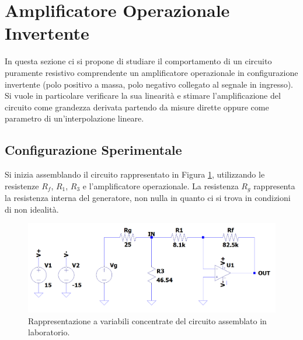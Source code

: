 \documentclass[a4paper,11pt]{article} %
\begin{document}
\cleardoublepage



\section{Amplificatore Operazionale Invertente}
In questa sezione ci si propone di studiare il comportamento di un circuito puramente resistivo comprendente un
amplificatore operazionale in configurazione invertente (polo positivo a massa, polo negativo collegato al segnale in
ingresso). Si vuole in particolare verificare la sua linearità e stimare l'amplificazione del circuito come grandezza derivata
partendo da misure dirette oppure come parametro di un'interpolazione lineare. 



\subsection{Configurazione Sperimentale}

Si inizia assemblando il circuito rappresentato in Figura \ref{i:opamp_circuit}, utilizzando le resistenze $R_f$, $R_1$, $R_3$ e l'amplificatore
operazionale. La resistenza $R_g$ rappresenta la resistenza interna del generatore, non nulla in quanto ci si trova in
condizioni di non idealità. 

\begin{figure}[H]
	\centering
	\includegraphics[width=\linewidth]{../Simulations/OpAmp/circuit_image_nosim.png}
	\caption{Rappresentazione a variabili concentrate del circuito assemblato in laboratorio.}
	\label{i:opamp_circuit}
\end{figure}
\end{document}
